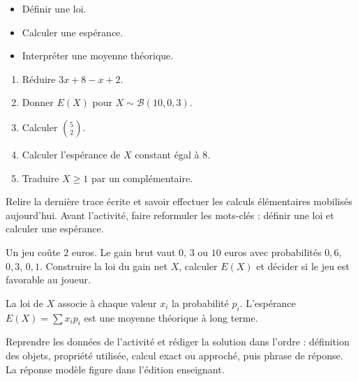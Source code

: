 \begin{objectifs}\begin{itemize}\item Définir une loi.\item Calculer une espérance.\item Interpréter une moyenne théorique.\end{itemize}\end{objectifs}
\begin{automatismes}\begin{enumerate}\item Réduire $3x+8-x+2$. \item Donner $E(X)$ pour $X\sim\mathcal B(10,0{,}3)$. \item Calculer $\binom52$. \item Calculer l'espérance de $X$ constant égal à $8$. \item Traduire $X\geq1$ par un complémentaire. \end{enumerate}\end{automatismes}
\begin{prerequis}Relire la dernière trace écrite et savoir effectuer les calculs élémentaires mobilisés aujourd'hui. Avant l'activité, faire reformuler les mots-clés : définir une loi et calculer une espérance.\end{prerequis}

\begin{activite}
Un jeu coûte $2$ euros. Le gain brut vaut $0$, $3$ ou $10$ euros avec probabilités $0{,}6$, $0{,}3$, $0{,}1$. Construire la loi du gain net $X$, calculer $E(X)$ et décider si le jeu est favorable au joueur.

\end{activite}

\begin{traceecrite}La loi de $X$ associe à chaque valeur $x_i$ la probabilité $p_i$. L'espérance $E(X)=\sum x_ip_i$ est une moyenne théorique à long terme.\end{traceecrite}

\begin{exemple}
Reprendre les données de l'activité et rédiger la solution dans l'ordre : définition des objets, propriété utilisée, calcul exact ou approché, puis phrase de réponse. La réponse modèle figure dans l'édition enseignant.
\end{exemple}

